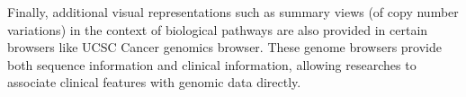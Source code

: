 Finally, additional visual representations such as summary views (of copy number variations) in the context of biological pathways are also provided in certain browsers like UCSC Cancer genomics browser\cite{ucscgenome}. These genome browsers provide both sequence information and clinical information, allowing researches to associate clinical features with genomic data directly.





